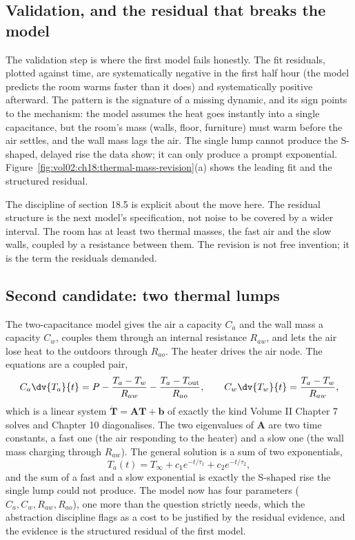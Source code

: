 \subsection{Validation, and the residual that breaks the model}

The validation step is where the first model fails honestly. The fit
residuals, plotted against time, are systematically
negative in the first half hour (the model predicts the room warms
faster than it does) and systematically positive afterward. The pattern
is the signature of a missing dynamic, and its sign points to the
mechanism: the model assumes the heat goes instantly into a single
capacitance, but the room's mass (walls, floor, furniture) must warm
before the air settles, and the wall mass lags the air. The single lump
cannot produce the S-shaped, delayed rise the data show; it can only
produce a prompt exponential.
Figure~\ref{fig:vol02:ch18:thermal-mass-revision}(a) shows the leading
fit and the structured residual.

The discipline of section 18.5 is explicit about the move here. The
residual structure is the next model's specification, not noise to be
covered by a wider interval. The room has at least two thermal
masses, the fast air and the slow walls, coupled by a resistance between
them. The revision is not free invention; it is the term the residuals
demanded.



\subsection{Second candidate: two thermal lumps}

The two-capacitance model gives the air a capacity $C_a$ and the wall
mass a capacity $C_w$, couples them through an internal resistance
$R_{aw}$, and lets the air lose heat to the outdoors through $R_{ao}$.
The heater drives the air node. The equations are a coupled pair,
\[
C_a \dv{T_a}{t} = P - \frac{T_a - T_w}{R_{aw}} - \frac{T_a - T_{\text{out}}}{R_{ao}},
\qquad
C_w \dv{T_w}{t} = \frac{T_a - T_w}{R_{aw}},
\]
which is a linear system $\dot{\mathbf{T}} = \mathbf{A}\mathbf{T} +
\mathbf{b}$ of exactly the kind Volume II Chapter 7 solves and Chapter
10 diagonalises. The two eigenvalues of $\mathbf{A}$ are two time
constants, a fast one (the air responding to the heater) and a slow one
(the wall mass charging through $R_{aw}$). The general solution is a sum
of two exponentials,
\[
T_a(t) = T_\infty + c_1 e^{-t/\tau_1} + c_2 e^{-t/\tau_2},
\]
and the sum of a fast and a slow exponential is exactly the S-shaped
rise the single lump could not produce. The model now has four
parameters ($C_a, C_w, R_{aw}, R_{ao}$), one more than the question
strictly needs, which the abstraction discipline flags as a cost to be
justified by the residual evidence, and the evidence is the structured
residual of the first model.

